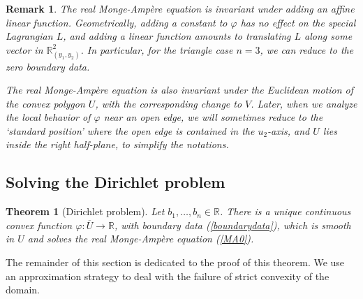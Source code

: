 \documentclass[11pt]{article}
\newtheorem{theorem}{Theorem}
\newtheorem{remark}{Remark}
\begin{document}
\begin{remark}\label{standardposition}
The real Monge-Amp\`ere equation is invariant under adding an affine linear function. Geometrically, adding a constant to $\varphi$ has no effect on the special Lagrangian $L$, and adding a linear function amounts to translating $L$ along some vector in $\mathbb{R}_{(y_1,y_2)}^2$. In particular, for the triangle case $n=3$, we can reduce to the zero boundary data.  

The real Monge-Amp\`ere equation is also invariant under the Euclidean motion of the convex polygon $U$, with the corresponding change to $V$. Later, when we analyze the local behavior of $\varphi$ near an open edge, we will sometimes reduce to the `standard position' where the open edge is contained in the $u_2$-axis, and $U$ lies inside the right half-plane, to simplify the notations.
\end{remark}

 
 
 









\subsection{Solving the Dirichlet problem}\label{RMAequation}




\begin{theorem}
[Dirichlet problem]
Let $b_1, \ldots, b_n \in \mathbb{R}$. There is a unique continuous convex function $\varphi: \overline{U} \to \mathbb{R}$, with boundary data (\ref{boundarydata}), which is smooth in $U$ and solves the real Monge-Amp\`ere equation (\ref{MA0}).
\end{theorem}



The remainder of this section is dedicated to the proof of this theorem. We use an approximation strategy to deal with the failure of strict convexity of the domain.
\end{document}
